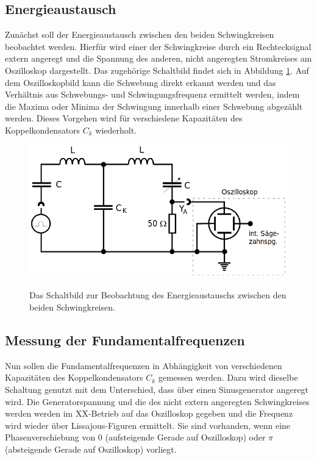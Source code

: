 \documentclass[titlepage = firstcover]{scrartcl}
\begin{document}
    \subsection{Energieaustausch}
        Zunächst soll der Energieaustausch zwischen den beiden Schwingkreisen beobachtet werden. Hierfür wird einer der Schwingkreise durch ein Rechtecksignal
        extern angeregt und die Spannung des anderen, nicht angeregten Stromkreises am Oszilloskop dargestellt. Das zugehörige Schaltbild findet sich in 
        Abbildung \ref{fig:Energieaustausch}. Auf dem Oszilloskopbild kann die Schwebung direkt erkannt werden und das Verhältnis aus Schwebungs- und Schwingungsfrequenz ermittelt
        werden, indem die Maxima oder Minima der Schwingung innerhalb einer Schwebung abgezählt werden. Dieses Vorgehen wird für verschiedene Kapazitäten des
        Koppelkondensators $C_k$ wiederholt.
        \begin{figure}[h]
            \centering
            \caption{Das Schaltbild zur Beobachtung des Energieaustauschs zwischen den beiden Schwingkreisen.}
            \includegraphics[width = 0.4\linewidth]{Energieaustausch.png}
            \label{fig:Energieaustausch}
          \end{figure}

    \subsection{Messung der Fundamentalfrequenzen}
          Nun sollen die Fundamentalfrequenzen in Abhängigkeit von verschiedenen Kapazitäten des Koppelkondensators $C_k$ gemessen werden. Dazu wird dieselbe Schaltung 
          genutzt mit dem Unterschied, dass über einen Sinusgenerator angeregt wird. Die Generatorspannung und die des nicht extern angeregten Schwingkreises werden
          werden im XX-Betrieb auf das Oszilloskop gegeben und die Frequenz wird wieder über Lissajous-Figuren ermittelt. Sie sind vorhanden, wenn eine 
          Phasenverschiebung von 0 (aufsteigende Gerade auf Oszilloskop) oder $\pi$ (absteigende Gerade auf Oszilloskop) vorliegt. 
          
\end{document}

